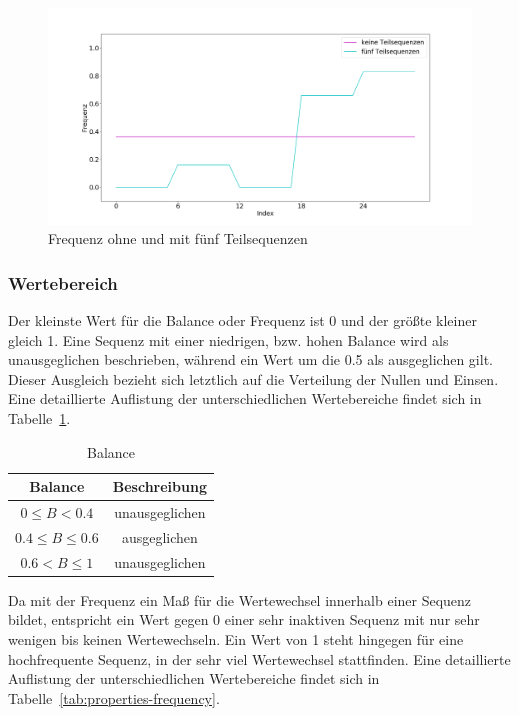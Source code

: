 \begin{theorem}
\begin{figure}[H]
	\centering
	\includegraphics[scale=0.32]{images/sequences/subsequences-frequency}
	\caption{Frequenz ohne und mit fünf Teilsequenzen}
	\label{fig:properties-subsequences-frequency}
\end{figure}
\end{theorem}

\subsubsection{Wertebereich}

Der kleinste Wert für die Balance oder Frequenz ist 0 und der größte kleiner gleich 1. Eine Sequenz mit einer niedrigen, bzw. hohen Balance wird als unausgeglichen beschrieben, während ein Wert um die 0.5 als ausgeglichen gilt. Dieser Ausgleich bezieht sich letztlich auf die Verteilung der Nullen und Einsen. Eine detaillierte Auflistung der unterschiedlichen Wertebereiche findet sich in Tabelle~\ref{tab:properties-balance}. 

\begin{table}[H]
	\begin{center}
		\begin{tabular}{|c c|}
			\hline
			Balance & Beschreibung \\
			\hline\hline
			$0 \leq B < 0.4$ & unausgeglichen \\ 
			\hline
			$0.4 \leq B \leq 0.6$ & ausgeglichen \\
			\hline
			$0.6 < B \leq 1$ & unausgeglichen \\
			\hline
		\end{tabular}
		\caption{Balance}
		\label{tab:properties-balance}
	\end{center}
\end{table}

Da mit der Frequenz ein Maß für die Wertewechsel innerhalb einer Sequenz bildet, entspricht ein Wert gegen 0 einer sehr inaktiven Sequenz mit nur sehr wenigen bis keinen Wertewechseln. Ein Wert von 1 steht hingegen für eine hochfrequente Sequenz, in der sehr viel Wertewechsel stattfinden. Eine detaillierte Auflistung der unterschiedlichen Wertebereiche findet sich in Tabelle~\ref{tab:properties-frequency}. 

